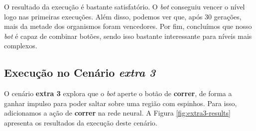 O resultado da execução é bastante satisfatório. O \textit{bot} conseguiu
vencer o nível logo nas primeiras execuções. Além disso, podemos ver que, após
30 gerações, mais da metade dos organismos foram vencedores. Por fim,
concluímos que nosso \textit{bot} é capaz de combinar botões, sendo isso
bastante interessante para níveis mais complexos.  

\subsection{Execução no Cenário \textit{extra 3}}

O cenário \textbf{extra 3} explora que o \textit{bot} aperte o botão de
\textbf{correr}, de forma a ganhar impulso para poder saltar sobre uma região
com espinhos. Para isso, adicionamos a ação de \textbf{correr} na rede neural.
A Figura \ref{fig:extra3-results} apresenta os resultados da execução deste
cenário.

